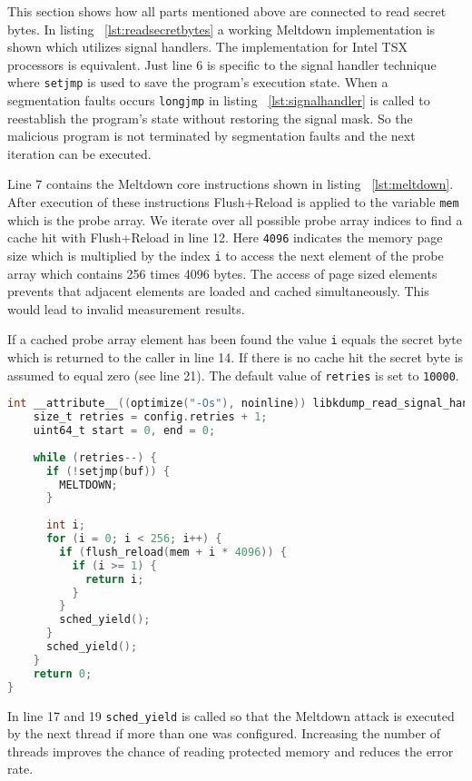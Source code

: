 \documentclass[a4paper,oneside,openright] {scrreprt}
\begin{document}
This section shows how all parts mentioned above are connected to read secret bytes.
In listing ~\ref{lst:readsecretbytes} a working Meltdown implementation is shown which utilizes
signal handlers. The implementation for Intel TSX processors is equivalent.
Just line 6 is specific to the signal handler technique where \texttt{setjmp} is used to save the program's execution state.
When a segmentation faults occurs \texttt{longjmp} in listing ~\ref{lst:signalhandler} is called to reestablish the program's state
without restoring the signal mask. 
So the malicious program is not terminated by segmentation faults and the next iteration can be executed.

Line 7 contains the Meltdown core instructions shown in listing ~\ref{lst:meltdown}.
After execution of these instructions Flush+Reload is applied to the variable \texttt{mem} which is the probe array.
We iterate over all possible probe array indices to find a cache hit with Flush+Reload in line 12.
Here \texttt{4096} indicates the memory page size which is multiplied by the index \texttt{i} to access the next element
of the probe array which contains 256 times 4096 bytes. The access of page sized elements prevents that adjacent elements are loaded
and cached simultaneously. This would lead to invalid measurement results.

If a cached probe array element has been found the value \texttt{i} equals the secret byte which is returned to the caller
in line 14. If there is no cache hit the secret byte is assumed to equal zero (see line 21).
The default value of \texttt{retries} is set to \texttt{10000}. 


\begin{lstlisting}[language=C, caption=Meltdown: Reading Secret Bytes, label={lst:readsecretbytes}]
int __attribute__((optimize("-Os"), noinline)) libkdump_read_signal_handler() {
    size_t retries = config.retries + 1;
    uint64_t start = 0, end = 0;
  
    while (retries--) {
      if (!setjmp(buf)) {
        MELTDOWN;
      }
  
      int i;
      for (i = 0; i < 256; i++) {
        if (flush_reload(mem + i * 4096)) {
          if (i >= 1) {
            return i;
          }
        }
        sched_yield();
      }
      sched_yield();
    }
    return 0;
}
\end{lstlisting}

In line 17 and 19 \texttt{sched\_yield} is called so that the Meltdown attack is executed by the next thread if more
than one was configured. 
Increasing the number of threads improves the chance of reading protected memory and reduces the error rate.
\end{document}
